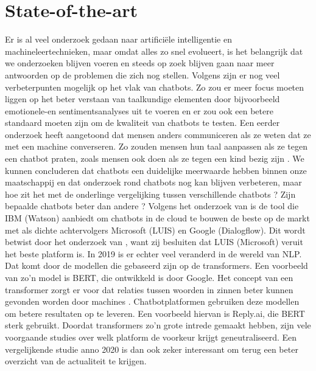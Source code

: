 
\section{State-of-the-art}
\label{sec:state-of-the-art}
Er is al veel onderzoek gedaan naar artificiële intelligentie en machineleertechnieken, maar omdat alles zo snel evolueert, is het belangrijk dat we onderzoeken blijven voeren en steeds op zoek blijven  gaan naar meer antwoorden op de problemen die zich nog stellen. Volgens  \textcite{Hussain2019} zijn er nog veel verbeterpunten mogelijk op het vlak van chatbots. Zo zou er meer focus moeten liggen op het beter verstaan van taalkundige elementen door bijvoorbeeld emotionele-en sentimentsanalyses uit te voeren en er zou ook een betere standaard moeten zijn om de kwaliteit van chatbots te testen. Een eerder onderzoek heeft aangetoond dat mensen anders communiceren als ze weten dat ze met een machine converseren. Zo zouden mensen hun taal aanpassen als ze tegen een chatbot praten, zoals mensen ook doen als ze tegen een kind bezig zijn \autocite{Hill2015}.
We kunnen concluderen dat chatbots een duidelijke meerwaarde hebben binnen onze maatschappij en dat onderzoek rond chatbots nog kan blijven verbeteren, maar hoe zit het met de onderlinge vergelijking tussen verschillende chatbots ? Zijn bepaalde chatbots beter dan andere ? Volgens het onderzoek van \textcite{Russis2018} is de tool die IBM (Watson) aanbiedt om chatbots in de cloud te bouwen de beste op de markt met als dichte achtervolgers Microsoft (LUIS) en Google (Dialogflow). Dit wordt betwist door het onderzoek van \textcite{Langen2017}, want zij besluiten dat LUIS (Microsoft) veruit het beste platform is. In 2019 is er echter veel veranderd in de wereld van NLP. Dat komt door de modellen die gebaseerd zijn op de transformers. Een voorbeeld van zo’n model is BERT, die ontwikkeld is door Google. Het concept van een transformer zorgt er voor dat relaties tussen woorden in zinnen beter kunnen gevonden worden door machines \autocite{Joshi2019}. Chatbotplatformen gebruiken deze modellen om betere resultaten op te leveren. Een voorbeeld hiervan is Reply.ai, die BERT sterk gebruikt. Doordat transformers zo’n grote intrede gemaakt hebben, zijn vele voorgaande studies over welk platform de voorkeur krijgt geneutraliseerd. Een vergelijkende studie anno 2020 is dan ook zeker interessant om terug een beter overzicht van de actualiteit te krijgen.


